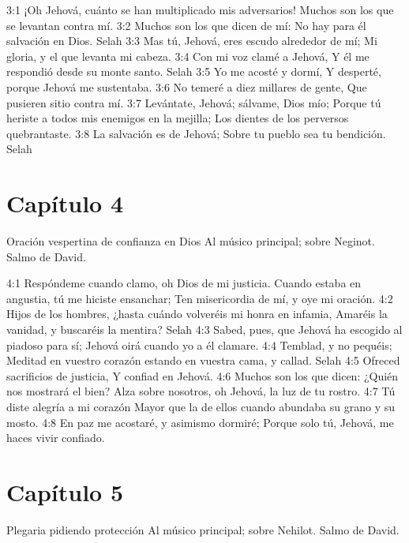 3:1 ¡Oh Jehová, cuánto se han multiplicado mis adversarios! 
Muchos son los que se levantan contra mí. 
3:2 Muchos son los que dicen de mí: 
No hay para él salvación en Dios. Selah 
3:3 Mas tú, Jehová, eres escudo alrededor de mí; 
Mi gloria, y el que levanta mi cabeza. 
3:4 Con mi voz clamé a Jehová, 
Y él me respondió desde su monte santo. Selah 
3:5 Yo me acosté y dormí, 
Y desperté, porque Jehová me sustentaba. 
3:6 No temeré a diez millares de gente, 
Que pusieren sitio contra mí. 
3:7 Levántate, Jehová; sálvame, Dios mío; 
Porque tú heriste a todos mis enemigos en la mejilla; 
Los dientes de los perversos quebrantaste. 
3:8 La salvación es de Jehová; 
Sobre tu pueblo sea tu bendición. Selah 
\section*{Capítulo 4}
Oración vespertina de confianza en Dios 
Al músico principal; sobre Neginot. Salmo de David. 

4:1 Respóndeme cuando clamo, oh Dios de mi justicia. 
Cuando estaba en angustia, tú me hiciste ensanchar; 
Ten misericordia de mí, y oye mi oración. 
4:2 Hijos de los hombres, ¿hasta cuándo volveréis mi honra en infamia, 
Amaréis la vanidad, y buscaréis la mentira? Selah 
4:3 Sabed, pues, que Jehová ha escogido al piadoso para sí; 
Jehová oirá cuando yo a él clamare. 
4:4 Temblad, y no pequéis; 
Meditad en vuestro corazón estando en vuestra cama, y callad. Selah 
4:5 Ofreced sacrificios de justicia, 
Y confiad en Jehová. 
4:6 Muchos son los que dicen: ¿Quién nos mostrará el bien? 
Alza sobre nosotros, oh Jehová, la luz de tu rostro. 
4:7 Tú diste alegría a mi corazón 
Mayor que la de ellos cuando abundaba su grano y su mosto. 
4:8 En paz me acostaré, y asimismo dormiré; 
Porque solo tú, Jehová, me haces vivir confiado. 
\section*{Capítulo 5}
Plegaria pidiendo protección 
Al músico principal; sobre Nehilot. Salmo de David. 


